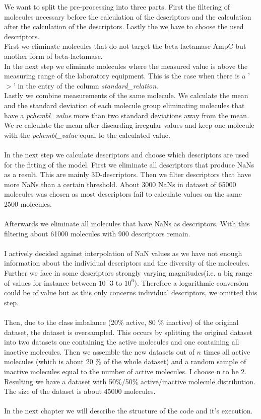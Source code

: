 \documentclass[12pt]{article}
\begin{document}
We want to split the pre-processing into three parts. First the filtering of molecules necessary before the calculation of the descriptors and the calculation after the calculation of the descriptors. Lastly the we have to choose the used descriptors.\\
First we eliminate molecules that do not target the beta-lactamase AmpC but another form of beta-lactamase.\\
%
In the next step we eliminate molecules where the measured value is above the measuring range of the laboratory equipment. This is the case when there is a '$>$' in the entry of the column \textit{standard\_relation}.\\
%
Lastly we combine measurements of the same molecule. We calculate the mean and the standard deviation of each molecule group eliminating molecules that have a \textit{pchembl\_value} more than two standard deviations away from the mean. We re-calculate the mean after discarding irregular values and keep one molecule with the \textit{pchembl\_value} equal to the calculated value.\\\\
%
In the next step we calculate descriptors and choose which descriptors are used for the fitting of the model. First we eliminate all descriptors that produce NaNs as a result. This are mainly 3D-descriptors. Then we filter descriptors that have more NaNs than a certain threshold. About 3000 NaNs in dataset of 65000 molecules was chosen as most descriptors fail to calculate values on the same 2500 molecules.\\\\
%
Afterwards we eliminate all molecules that have NaNs as descriptors. With this filtering about 61000 molecules with 900 descriptors remain.\\\\
%
I actively decided against interpolation of NaN values as we have not enough information about the individual descriptors and the diversity of the molecules. Further we face in some descriptors strongly varying magnitudes(i.e. a big range of values for instance between $10^-3$ to $10^6$). Therefore a logarithmic conversion could be of value but as this only concerns individual descriptors, we omitted this step.\\\\ 
%
Then, due to the class imbalance (20\% active, 80 \% inactive) of the original dataset, the dataset is oversampled. This occurs by splitting the original dataset into two datasets one containing  the active molecules and one containing all inactive molecules. Then we assemble the new datasets out of $n$ times all active molecules (which is about 20 \% of the whole dataset) and a random sample of inactive molecules equal to the number of active molecules. I choose n to be 2. Resulting we have a dataset with 50\%/50\% active/inactive molecule distribution. The size of the dataset is about 45000 molecules.\\\\
In the next chapter we will describe the structure of the code and it's execution.
%
%
\end{document}
